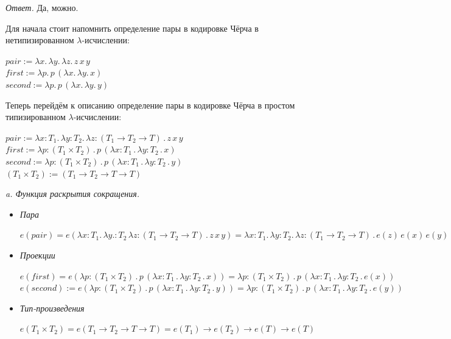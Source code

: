 \documentclass[landscape, 11pt]{report}
\begin{document}
	\vspace{0.2cm}

	\textit{Ответ.} Да, можно.
	
	Для начала стоит напомнить определение пары в кодировке Чёрча в нетипизированном $\lambda$-исчислении:
	
	\begin{center}
		$pair := \lambda x . \, \lambda y. \, \lambda z. \, z \, x \, y$\\
		$first := \lambda p . \, p \, (\lambda x . \, \lambda y . \, x)$\\
		$second := \lambda p . \, p \, (\lambda x . \, \lambda y . \, y)$
	\end{center}
	
	Теперь перейдём к описанию определение пары в кодировке Чёрча в простом типизированном $\lambda$-исчислении:

	\begin{center}
		$pair := \lambda x : T_1. \, \lambda y : T_2. \, \lambda z : (T_1 \rightarrow T_2 \rightarrow T) \, . \, z \, x \, y$\\
		$first := \lambda p : (T_1 \times T_2) \, . \, p \, (\lambda x : T_1 \, . \, \lambda y : T_2 \, . \, x)$\\
		$second := \lambda p : (T_1 \times T_2) \, . \, p \, (\lambda x : T_1 \, . \, \lambda y : T_2 \, . \, y)$\\
		$(T_1 \times T_2) := (T_1 \rightarrow T_2 \rightarrow T \rightarrow T)$
	\end{center}

	\newpage

	\textit{a. Функция раскрытия сокращения.}
	
	\begin{itemize}
		\item {\textit{Пара}

		$e(pair) = e(\lambda x : T_1. \, \lambda y. : T_2 \, \lambda z : (T_1 \rightarrow T_2 \rightarrow T) \, . \, z \, x \, y) = \lambda x : T_1. \, \lambda y : T_2. \, \lambda z : (T_1 \rightarrow T_2 \rightarrow T) \, . \, e(z) \, e(x) \, e(y)$
		}

		\item {\textit{Проекции}
	
		$e(first) = e(\lambda p : (T_1 \times T_2) \, . \, p \, (\lambda x : T_1 \, . \, \lambda y : T_2 \, . \, x)) = \lambda p : (T_1 \times T_2) \, . \, p \, (\lambda x : T_1 \, . \, \lambda y : T_2 \, . \, e (x))$\\
		$e(second) := e(\lambda p : (T_1 \times T_2) \, . \, p \, (\lambda x : T_1 \, . \, \lambda y : T_2 \, . \, y)) = \lambda p : (T_1 \times T_2) \, . \, p \, (\lambda x : T_1 \, . \, \lambda y : T_2 \, . \, e(y))$
		}
	
		\item {\textit{Тип-произведения}

		$e(T_1 \times T_2) = e(T_1 \rightarrow T_2 \rightarrow T \rightarrow T) = e(T_1) \rightarrow e(T_2) \rightarrow e(T) \rightarrow e(T)$\\
		}
		
	\end{itemize}
\end{document}

